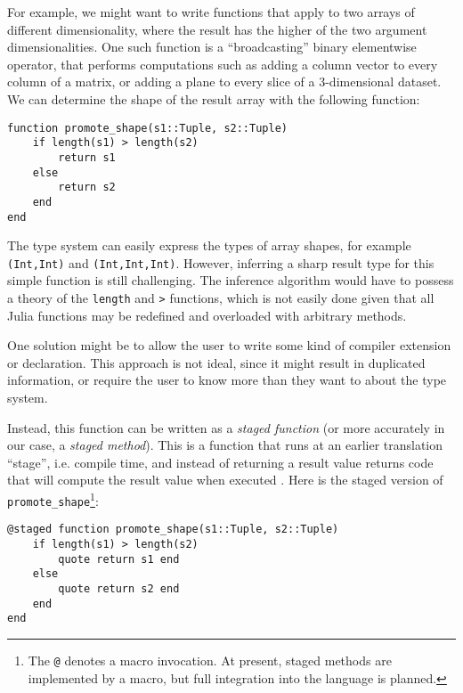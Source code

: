 For example, we might want to write functions that apply to two
arrays of different dimensionality, where the result has the higher of the
two argument dimensionalities. One such function is a ``broadcasting''
binary elementwise operator, that performs computations such as adding a
column vector to every column of a matrix, or adding a plane to every slice
of a 3-dimensional dataset. We can determine the shape of the result
array with the following function:

\vspace{-0.25in}
\begin{singlespace}
\begin{verbatim}
function promote_shape(s1::Tuple, s2::Tuple)
    if length(s1) > length(s2)
        return s1
    else
        return s2
    end
end
\end{verbatim}
\end{singlespace}

The type system can easily express the types of array shapes, for example
{\tt (Int,Int)} and {\tt (Int,Int,Int)}. However, inferring a sharp result
type for this simple function is still challenging. The inference algorithm
would have to possess a theory of the {\tt length} and {\tt >} functions,
which is not easily done given that all Julia functions may be redefined
and overloaded with arbitrary methods.

One solution might be to allow the user to write some kind of compiler
extension or declaration. This approach is not ideal, since it might
result in duplicated information, or require the user to know more than
they want to about the type system.

Instead, this function can be written as a \emph{staged function} (or
more accurately in our case, a \emph{staged method}). This is a function
that runs at an earlier translation ``stage'', i.e. compile time, and
instead of returning a result value returns code that will compute the
result value when executed \cite{staging}.
Here is the staged version of
{\tt promote\_shape}\footnote{The {\tt @} denotes a macro invocation. At
present, staged methods are implemented by a macro, but full integration
into the language is planned.}:

\vspace{-0.2in}
\begin{singlespace}
\begin{verbatim}
@staged function promote_shape(s1::Tuple, s2::Tuple)
    if length(s1) > length(s2)
        quote return s1 end
    else
        quote return s2 end
    end
end
\end{verbatim}
\end{singlespace}

